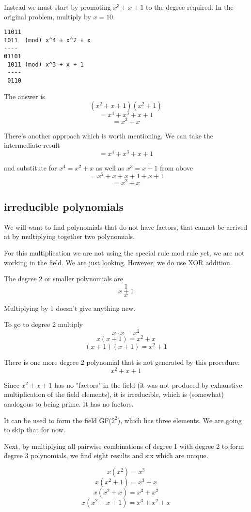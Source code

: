\documentclass[11pt, oneside]{article}
\begin{document}
Instead we must start by promoting $x^3 + x + 1$ to the degree required.  In the original problem, multiply by $x = 10$.

\begin{verbatim}
11011
1011  (mod) x^4 + x^2 + x 
----
01101
 1011 (mod) x^3 + x + 1
 ----
 0110
 \end{verbatim}

The answer is 
\[ (x^2 + x + 1)(x^2 + 1) \]
\[ = x^4 + x^3 + x + 1 \]
\[ = x^2 + x \] 

There's another approach which is worth mentioning.  We can take the intermediate result
\[ = x^4 + x^3 + x + 1 \]

and substitute for $x^4 = x^2 + x$ as well as $x^3 = x + 1$ from above
\[ = x^2 + x + x + 1 + x + 1 \]
\[ = x^2 + x \]

\subsection*{irreducible polynomials}
We will want to find polynomials that do not have factors, that cannot be arrived at by multiplying together two polynomials.

For this multiplication we are not using the special rule mod rule yet, we are not working in the field.  We are just looking.  However, we do use XOR addition.

The degree 2 or smaller polynomials are
\[ 1 \]
\[ x + 1 \]
\[ x \]

Multiplying by $1$ doesn't give anything new.

To go to degree 2 multiply 
\[ x \cdot x = x^2 \]
\[ x(x + 1) = x^2 + x \]
\[ (x + 1)(x + 1) = x^2 + 1 \]

There is one more degree 2 polynomial that is not generated by this procedure:
\[ x^2 + x + 1 \]

Since $x^2 + x + 1$ has no "factors" in the field (it was not produced by exhaustive multiplication of the field elements), it is irreducible, which is (somewhat) analogous to being prime.  It has no factors.  

It can be used to form the field GF($2^2$), which has three elements.  We are going to skip that for now.

Next, by multiplying all pairwise combinations of degree 1 with degree 2 to form degree 3 polynomials, we find eight results and six which are unique.

\[ x(x^2) = x^3 \]
\[ x(x^2 + 1) = x^3 + x  \]
\[ x(x^2 + x) = x^3 + x^2 \]
\[ x(x^2 + x + 1) = x^3 + x^2 + x  \]
\end{document}
